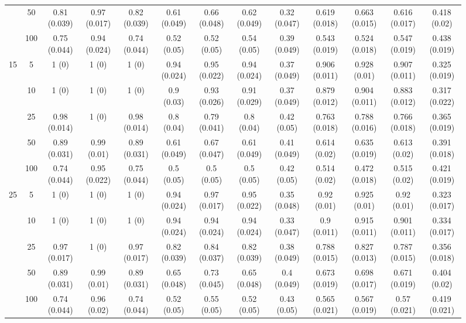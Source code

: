\documentclass[10pt]{article}
\theoremstyle{definition}
\begin{document}
\begin{sidewaysfigure}
\begin{tabular}{cc|ccc|cccc|cccc}
    & 50  & 0.81 (0.039) & 0.97 (0.017) & 0.82 (0.039) & 0.61 (0.049) & 0.66 (0.048) & 0.62 (0.049) & 0.32 (0.047) & 0.619 (0.018) & 0.663 (0.015) & 0.616 (0.017) & 0.418 (0.02) \\ 
    & 100  & 0.75 (0.044) & 0.94 (0.024) & 0.74 (0.044) & 0.52 (0.05) & 0.52 (0.05) & 0.54 (0.05) & 0.39 (0.049) & 0.543 (0.019) & 0.524 (0.018) & 0.547 (0.019) & 0.438 (0.019) \\[.3cm]  
    \multirow{5}{*}{15}  & 5  & 1 (0) & 1 (0) & 1 (0) & 0.94 (0.024) & 0.95 (0.022) & 0.94 (0.024) & 0.37 (0.049) & 0.906 (0.011) & 0.928 (0.01) & 0.907 (0.011) & 0.325 (0.019) \\ 
    & 10  & 1 (0) & 1 (0) & 1 (0) & 0.9 (0.03) & 0.93 (0.026) & 0.91 (0.029) & 0.37 (0.049) & 0.879 (0.012) & 0.904 (0.011) & 0.883 (0.012) & 0.317 (0.022) \\ 
    & 25  & 0.98 (0.014) & 1 (0) & 0.98 (0.014) & 0.8 (0.04) & 0.79 (0.041) & 0.8 (0.04) & 0.42 (0.05) & 0.763 (0.018) & 0.788 (0.016) & 0.766 (0.018) & 0.365 (0.019) \\ 
    & 50  & 0.89 (0.031) & 0.99 (0.01) & 0.89 (0.031) & 0.61 (0.049) & 0.67 (0.047) & 0.61 (0.049) & 0.41 (0.049) & 0.614 (0.02) & 0.635 (0.019) & 0.613 (0.02) & 0.391 (0.018) \\ 
   & 100  & 0.74 (0.044) & 0.95 (0.022) & 0.75 (0.044) & 0.5 (0.05) & 0.5 (0.05) & 0.5 (0.05) & 0.42 (0.05) & 0.514 (0.02) & 0.472 (0.018) & 0.515 (0.02) & 0.421 (0.019) \\[.3cm]  
    \multirow{5}{*}{25}  & 5  & 1 (0) & 1 (0) & 1 (0) & 0.94 (0.024) & 0.97 (0.017) & 0.95 (0.022) & 0.35 (0.048) & 0.92 (0.01) & 0.925 (0.01) & 0.92 (0.01) & 0.323 (0.017) \\ 
    & 10  & 1 (0) & 1 (0) & 1 (0) & 0.94 (0.024) & 0.94 (0.024) & 0.94 (0.024) & 0.33 (0.047) & 0.9 (0.011) & 0.915 (0.011) & 0.901 (0.011) & 0.334 (0.017) \\ 
    & 25  & 0.97 (0.017) & 1 (0) & 0.97 (0.017) & 0.82 (0.039) & 0.84 (0.037) & 0.82 (0.039) & 0.38 (0.049) & 0.788 (0.015) & 0.827 (0.013) & 0.787 (0.015) & 0.356 (0.018) \\ 
   & 50  & 0.89 (0.031) & 0.99 (0.01) & 0.89 (0.031) & 0.65 (0.048) & 0.73 (0.045) & 0.65 (0.048) & 0.4 (0.049) & 0.673 (0.019) & 0.698 (0.017) & 0.671 (0.019) & 0.404 (0.02) \\ 
    & 100  & 0.74 (0.044) & 0.96 (0.02) & 0.74 (0.044) & 0.52 (0.05) & 0.55 (0.05) & 0.52 (0.05) & 0.43 (0.05) & 0.565 (0.021) & 0.567 (0.019) & 0.57 (0.021) & 0.419 (0.021) \\ 
\end{tabular}
\end{sidewaysfigure}
\end{document}
